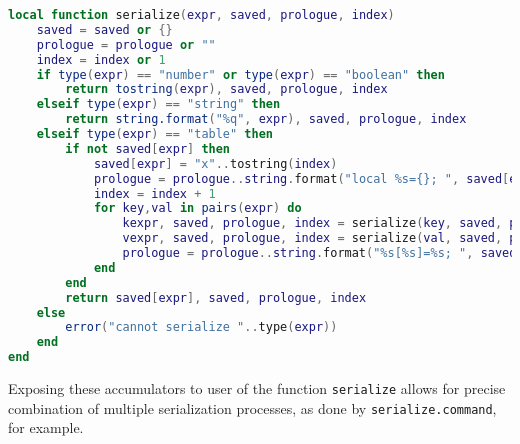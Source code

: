 \begin{lstlisting}[language=lua, caption={The private function \texttt{serialize} of the module \texttt{serialize}}, label=lst:serialize, name=lst:serialize]
local function serialize(expr, saved, prologue, index)
	saved = saved or {}
	prologue = prologue or ""
	index = index or 1
	if type(expr) == "number" or type(expr) == "boolean" then
		return tostring(expr), saved, prologue, index
	elseif type(expr) == "string" then
		return string.format("%q", expr), saved, prologue, index
	elseif type(expr) == "table" then
		if not saved[expr] then
			saved[expr] = "x"..tostring(index)
			prologue = prologue..string.format("local %s={}; ", saved[expr])
			index = index + 1
			for key,val in pairs(expr) do
				kexpr, saved, prologue, index = serialize(key, saved, prologue, index)
				vexpr, saved, prologue, index = serialize(val, saved, prologue, index)
				prologue = prologue..string.format("%s[%s]=%s; ", saved[expr], kexpr, vexpr)
			end
		end
		return saved[expr], saved, prologue, index
	else
		error("cannot serialize "..type(expr))
	end
end
\end{lstlisting}

Exposing these accumulators to user of the function \texttt{serialize} allows for precise combination of multiple serialization processes, as done by \texttt{serialize.command}, for example.
